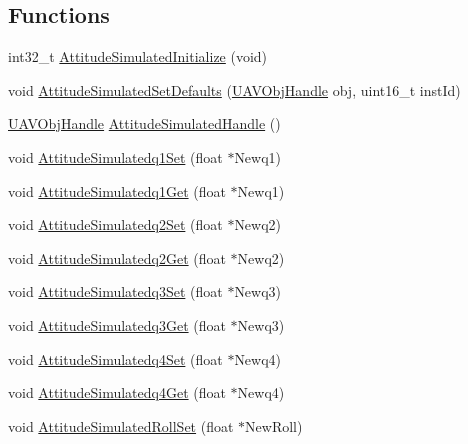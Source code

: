 \subsection*{\-Functions}
\begin{DoxyCompactItemize}
\item 
int32\-\_\-t \hyperlink{group___attitude_simulated_gab9095d690eb26340f40c9d57426b355f}{\-Attitude\-Simulated\-Initialize} (void)
\item 
void \hyperlink{group___attitude_simulated_ga4f67e46b7cb5e0ac5621c9ca41a745cc}{\-Attitude\-Simulated\-Set\-Defaults} (\hyperlink{targets_2_u_a_v_objects_2inc_2uavobjectmanager_8h_a279053e22be53ce9f895043aaeb91e3b}{\-U\-A\-V\-Obj\-Handle} obj, uint16\-\_\-t inst\-Id)
\item 
\hyperlink{targets_2_u_a_v_objects_2inc_2uavobjectmanager_8h_a279053e22be53ce9f895043aaeb91e3b}{\-U\-A\-V\-Obj\-Handle} \hyperlink{group___attitude_simulated_gadd8c5b6dfe89aa194583d5eca024b75b}{\-Attitude\-Simulated\-Handle} ()
\item 
void \hyperlink{group___attitude_simulated_gab652e8654a9ca9dc5cd46b8409cc724b}{\-Attitude\-Simulatedq1\-Set} (float $\ast$\-Newq1)
\item 
void \hyperlink{group___attitude_simulated_ga72e10aacf959dc2672c88e9539607075}{\-Attitude\-Simulatedq1\-Get} (float $\ast$\-Newq1)
\item 
void \hyperlink{group___attitude_simulated_gada21cfc1a1b7df224fa9483d15e202d8}{\-Attitude\-Simulatedq2\-Set} (float $\ast$\-Newq2)
\item 
void \hyperlink{group___attitude_simulated_gaec5251f98f0e3bf82d2aed3333fe4efb}{\-Attitude\-Simulatedq2\-Get} (float $\ast$\-Newq2)
\item 
void \hyperlink{group___attitude_simulated_gaa4a5ae6d7230c4abc7762fd1a7d3b3ed}{\-Attitude\-Simulatedq3\-Set} (float $\ast$\-Newq3)
\item 
void \hyperlink{group___attitude_simulated_gaf026eaeb84ae678c55251e7bd0007c50}{\-Attitude\-Simulatedq3\-Get} (float $\ast$\-Newq3)
\item 
void \hyperlink{group___attitude_simulated_ga8de57cfe5b4a8e704ecb65160f258aee}{\-Attitude\-Simulatedq4\-Set} (float $\ast$\-Newq4)
\item 
void \hyperlink{group___attitude_simulated_ga5c54a4f3da74f8eb60da1041c614b3a9}{\-Attitude\-Simulatedq4\-Get} (float $\ast$\-Newq4)
\item 
void \hyperlink{group___attitude_simulated_gae7f94a1355ae5ca02e5fb9e01f3c3eee}{\-Attitude\-Simulated\-Roll\-Set} (float $\ast$\-New\-Roll)

\end{DoxyCompactItemize}

